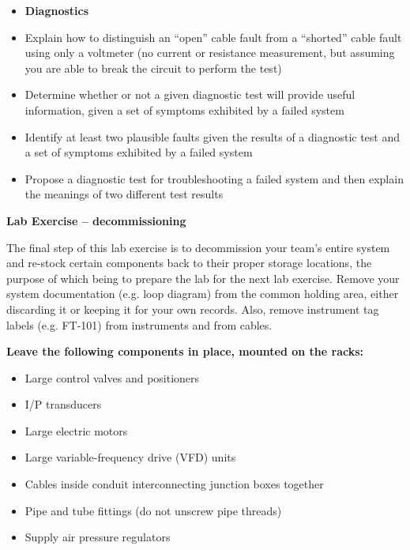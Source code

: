 \documentclass[12pt,a4paper]{article}
\begin{document}
\filbreak

\begin{itemize}
\item{} {\bf Diagnostics}
\item{} Explain how to distinguish an ``open'' cable fault from a ``shorted'' cable fault using only a voltmeter (no current or resistance measurement, but assuming you are able to break the circuit to perform the test)
\item{} Determine whether or not a given diagnostic test will provide useful information, given a set of symptoms exhibited by a failed system
\item{} Identify at least two plausible faults given the results of a diagnostic test and a set of symptoms exhibited by a failed system
\item{} Propose a diagnostic test for troubleshooting a failed system and then explain the meanings of two different test results
\end{itemize}



\vfil \eject

\noindent
{\bf Lab Exercise -- decommissioning}

\vskip 5pt

The final step of this lab exercise is to decommission your team's entire system and re-stock certain components back to their proper storage locations, the purpose of which being to prepare the lab for the next lab exercise.  Remove your system documentation (e.g. loop diagram) from the common holding area, either discarding it or keeping it for your own records.  Also, remove instrument tag labels (e.g. FT-101) from instruments and from cables.

\vskip 10pt

\indent
{\bf Leave the following components in place, mounted on the racks:}

\begin{itemize}
\item{} Large control valves and positioners
\item{} I/P transducers
\item{} Large electric motors
\item{} Large variable-frequency drive (VFD) units
\item{} Cables inside conduit interconnecting junction boxes together
\item{} Pipe and tube fittings (do not unscrew pipe threads)
\item{} Supply air pressure regulators
\end{itemize}
\end{document}
